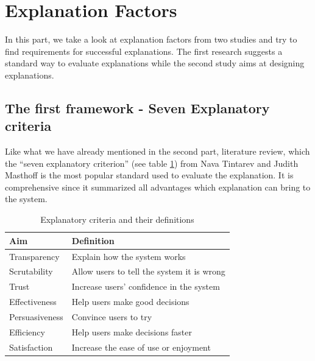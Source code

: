 \section{Explanation Factors}
    \indent 
    In this part, we take a look at explanation factors from two studies and try to find requirements for successful explanations. The first research suggests a standard way to evaluate explanations while the second study aims at designing explanations.
    
    \subsection{The first framework - Seven Explanatory criteria}

        \indent 
        Like what we have already mentioned in the second part, literature review, which the ``seven explanatory criterion'' \cite{tintarev2007survey}(see table \ref{table:1}) from Nava Tintarev and Judith Masthoff is the most popular standard used to evaluate the explanation. It is comprehensive since it summarized all advantages which explanation can bring to the system.

        \begin{table}[ht] 
            \centering
            \begin{tabular}{ | m{8em} | m{4cm} | }
            \hline
            \bfseries Aim & \bfseries Definition\\ [0.5ex] 
            \hline\hline
            Transparency & Explain how the system works\\ 
            \hline
            Scrutability & Allow users to tell the system it is wrong\\ 
            \hline
            Trust & Increase users' confidence in the system\\ 
            \hline
            Effectiveness & Help users make good decisions\\ 
            \hline
            Persuasiveness & Convince users to try\\ 
            \hline
            Efficiency & Help users make decisions faster\\ 
            \hline
            Satisfaction & Increase the ease of use or enjoyment\\ 
            \hline
            \end{tabular}
            \caption{Explanatory criteria and their definitions}
            \label{table:1}
        \end{table}

